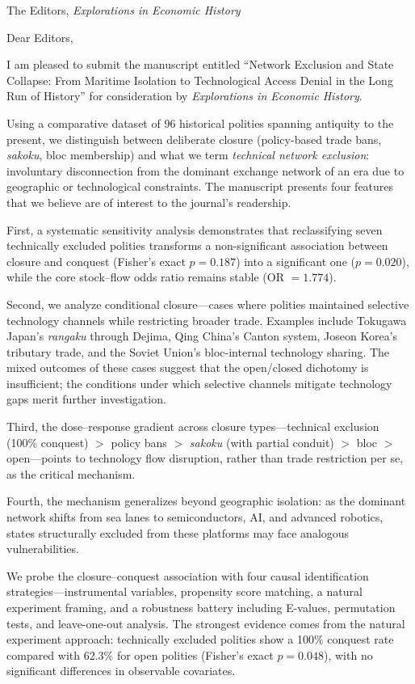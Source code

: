 \documentclass[11pt]{letter}
\begin{document}
\begin{letter}{The Editors, \emph{Explorations in Economic History}}
\opening{Dear Editors,}

I am pleased to submit the manuscript entitled ``Network Exclusion and State Collapse: From Maritime Isolation to Technological Access Denial in the Long Run of History'' for consideration by \emph{Explorations in Economic History}.

Using a comparative dataset of 96 historical polities spanning antiquity to the present, we distinguish between deliberate closure (policy-based trade bans, \emph{sakoku}, bloc membership) and what we term \emph{technical network exclusion}: involuntary disconnection from the dominant exchange network of an era due to geographic or technological constraints. The manuscript presents four features that we believe are of interest to the journal's readership.

First, a systematic sensitivity analysis demonstrates that reclassifying seven technically excluded polities transforms a non-significant association between closure and conquest (Fisher's exact $p = 0.187$) into a significant one ($p = 0.020$), while the core stock--flow odds ratio remains stable (OR $= 1.774$).

Second, we analyze conditional closure---cases where polities maintained selective technology channels while restricting broader trade. Examples include Tokugawa Japan's \emph{rangaku} through Dejima, Qing China's Canton system, Joseon Korea's tributary trade, and the Soviet Union's bloc-internal technology sharing. The mixed outcomes of these cases suggest that the open/closed dichotomy is insufficient; the conditions under which selective channels mitigate technology gaps merit further investigation.

Third, the dose--response gradient across closure types---technical exclusion (100\% conquest) $>$ policy bans $>$ \emph{sakoku} (with partial conduit) $>$ bloc $>$ open---points to technology flow disruption, rather than trade restriction per se, as the critical mechanism.

Fourth, the mechanism generalizes beyond geographic isolation: as the dominant network shifts from sea lanes to semiconductors, AI, and advanced robotics, states structurally excluded from these platforms may face analogous vulnerabilities.

We probe the closure--conquest association with four causal identification strategies---instrumental variables, propensity score matching, a natural experiment framing, and a robustness battery including E-values, permutation tests, and leave-one-out analysis. The strongest evidence comes from the natural experiment approach: technically excluded polities show a 100\% conquest rate compared with 62.3\% for open polities (Fisher's exact $p = 0.048$), with no significant differences in observable covariates.


\end{letter}
\end{document}
